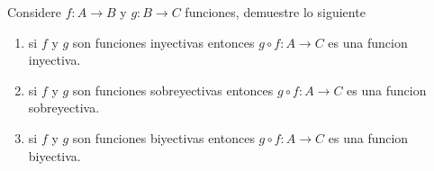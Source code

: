 \documentclass[../main.tex]{subfiles}
\begin{document}
\begin{problem}
  Considere $f: A \to B$ y $g: B \to C$ funciones, demuestre lo siguiente
  \begin{enumerate}
          \item si $f$ y $g$ son funciones inyectivas entonces $g \circ f: A \to C$ es una funcion inyectiva.
          \item si $f$ y $g$ son funciones sobreyectivas entonces $g \circ f: A \to C$ es una funcion sobreyectiva.
          \item si $f$ y $g$ son funciones biyectivas entonces $g \circ f: A \to C$ es una funcion biyectiva.
  \end{enumerate}
\end{problem}
%
%
\end{document}
